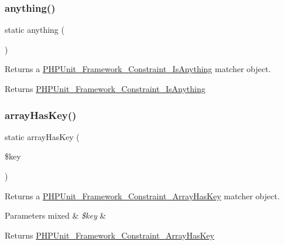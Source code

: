 \subsubsection{\texorpdfstring{anything()}{anything()}}
{\footnotesize\ttfamily static anything (\begin{DoxyParamCaption}{ }\end{DoxyParamCaption})\hspace{0.3cm}{\ttfamily [static]}}

Returns a \mbox{\hyperlink{class_p_h_p_unit___framework___constraint___is_anything}{P\+H\+P\+Unit\+\_\+\+Framework\+\_\+\+Constraint\+\_\+\+Is\+Anything}} matcher object.

\begin{DoxyReturn}{Returns}
\mbox{\hyperlink{class_p_h_p_unit___framework___constraint___is_anything}{P\+H\+P\+Unit\+\_\+\+Framework\+\_\+\+Constraint\+\_\+\+Is\+Anything}} 
\end{DoxyReturn}
\mbox{\label{class_p_h_p_unit___framework___assert_afaa89924d193bfdaa5ee4526515ddfe4}} 
\subsubsection{\texorpdfstring{array\+Has\+Key()}{arrayHasKey()}}
{\footnotesize\ttfamily static array\+Has\+Key (\begin{DoxyParamCaption}\item[{}]{\$key }\end{DoxyParamCaption})\hspace{0.3cm}{\ttfamily [static]}}

Returns a \mbox{\hyperlink{class_p_h_p_unit___framework___constraint___array_has_key}{P\+H\+P\+Unit\+\_\+\+Framework\+\_\+\+Constraint\+\_\+\+Array\+Has\+Key}} matcher object.


\begin{DoxyParams}[1]{Parameters}
mixed & {\em \$key} & \\
\hline
\end{DoxyParams}
\begin{DoxyReturn}{Returns}
\mbox{\hyperlink{class_p_h_p_unit___framework___constraint___array_has_key}{P\+H\+P\+Unit\+\_\+\+Framework\+\_\+\+Constraint\+\_\+\+Array\+Has\+Key}} 
\end{DoxyReturn}
\mbox{\label{class_p_h_p_unit___framework___assert_adac3de7f9d18aa19b6b06f46f0c204cc}} 
